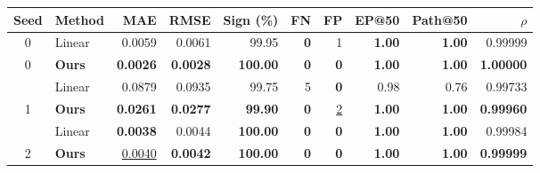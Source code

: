 \begin{tabular}{@{}clrrrrrrrr@{}}
\toprule
Seed & Method & MAE & RMSE & Sign (\%) & FN & FP & EP@50 & Path@50 & $\rho$ \\
\midrule
0 & Linear & 0.0059 & 0.0061 & 99.95 & \textbf{0} & 1 & \textbf{1.00} & \textbf{1.00} & 0.99999 \\
0 & \textbf{Ours} & \textbf{0.0026} & \textbf{0.0028} & \textbf{100.00} & \textbf{0} & \textbf{0} & \textbf{1.00} & \textbf{1.00} & \textbf{1.00000} \\
\addlinespace
1 & Linear & 0.0879 & 0.0935 & 99.75 & 5 & \textbf{0} & 0.98 & 0.76 & 0.99733 \\
1 & \textbf{Ours} & \textbf{0.0261} & \textbf{0.0277} & \textbf{99.90} & \textbf{0} & \underline{2} & \textbf{1.00} & \textbf{1.00} & \textbf{0.99960} \\
\addlinespace
2 & Linear & \textbf{0.0038} & 0.0044 & \textbf{100.00} & \textbf{0} & \textbf{0} & \textbf{1.00} & \textbf{1.00} & 0.99984 \\
2 & \textbf{Ours} & \underline{0.0040} & \textbf{0.0042} & \textbf{100.00} & \textbf{0} & \textbf{0} & \textbf{1.00} & \textbf{1.00} & \textbf{0.99999} \\
\bottomrule
\end{tabular}
